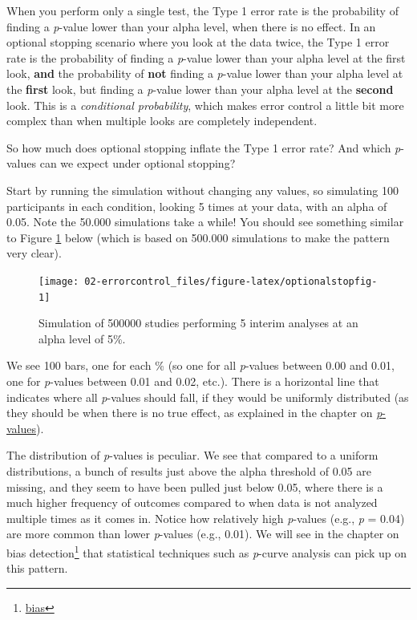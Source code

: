 \documentclass[
  oneside]{krantz}
\renewcommand{\href}[2]{#2\footnote{\url{#1}}}
\begin{document}
When you perform only a single test, the Type 1 error rate is the probability of finding a \emph{p}-value lower than your alpha level, when there is no effect. In an optional stopping scenario where you look at the data twice, the Type 1 error rate is the probability of finding a \emph{p}-value lower than your alpha level at the first look, \textbf{and} the probability of \textbf{not} finding a \emph{p}-value lower than your alpha level at the \textbf{first} look, but finding a \emph{p}-value lower than your alpha level at the \textbf{second} look. This is a \emph{conditional probability}, which makes error control a little bit more complex than when multiple looks are completely independent.

So how much does optional stopping inflate the Type 1 error rate? And which \emph{p}-values can we expect under optional stopping?

Start by running the simulation without changing any values, so simulating 100 participants in each condition, looking 5 times at your data, with an alpha of 0.05. Note the 50.000 simulations take a while! You should see something similar to Figure \ref{fig:optionalstopfig} below (which is based on 500.000 simulations to make the pattern very clear).



\begin{figure}

{\centering \texttt{[image: 02-errorcontrol\_files/figure-latex/optionalstopfig-1]} 

}

\caption{Simulation of 500000 studies performing 5 interim analyses at an alpha level of 5\%.}\label{fig:optionalstopfig}
\end{figure}

We see 100 bars, one for each \% (so one for all \emph{p}-values between 0.00 and 0.01, one for \emph{p}-values between 0.01 and 0.02, etc.). There is a horizontal line that indicates where all \emph{p}-values should fall, if they would be uniformly distributed (as they should be when there is no true effect, as explained in the chapter on \protect\hyperlink{pvalues}{\emph{p}-values}).

The distribution of \emph{p}-values is peculiar. We see that compared to a uniform distributions, a bunch of results just above the alpha threshold of 0.05 are missing, and they seem to have been pulled just below 0.05, where there is a much higher frequency of outcomes compared to when data is not analyzed multiple times as it comes in. Notice how relatively high \emph{p}-values (e.g., \emph{p} = 0.04) are more common than lower \emph{p}-values (e.g., 0.01). We will see in the chapter on \href{bias}{bias detection} that statistical techniques such as \emph{p}-curve analysis can pick up on this pattern.
\end{document}

